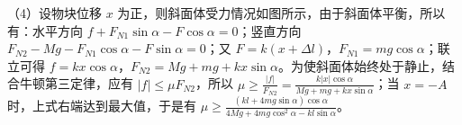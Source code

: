 \documentclass[\gkver]{gaokaozhenti}
\begin{document}
\begin{enumerate}
{（4）设物块位移 $x$ 为正，则斜面体受力情况如图所示，由于斜面体平衡，所以有：水平方向 $f+F_{N1}\sin\alpha-F\cos\alpha=0$；竖直方向 $F_{N2}-Mg-F_{N1}\cos\alpha-F\sin\alpha=0$；又 $F=k(x+\Delta l)$，$F_{N1}=mg\cos\alpha$；联立可得 $f=kx\cos\alpha$，$F_{N2}=Mg+mg+kx\sin\alpha$。为使斜面体始终处于静止，结合牛顿第三定律，应有 $|f|\leqslant\mu F_{N2}$，所以 $\mu\geqslant\frac{|f|}{F_{N2}}=\frac{k|x|\cos\alpha}{Mg+mg+kx\sin\alpha}$；当 $x=-A$ 时，上式右端达到最大值，于是有 $\mu\geqslant\frac{(kl+4mg\sin\alpha)\cos\alpha}{4Mg+4mg\cos^2\alpha-kl\sin\alpha}$。

}

\end{enumerate}
\end{document}
